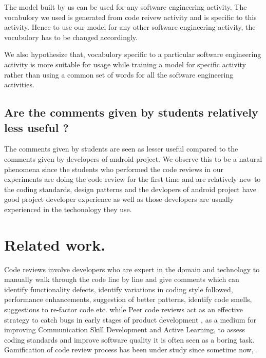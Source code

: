 \documentclass[conference]{IEEEtran}
\begin{document}
The model built by us can be used for any software engineering activity. The vocabulory we used is generated from code reivew activity and is specific to this activity. Hence to use our model for any other software engineering activity, the vocubulory has to be changed accordingly.

We also hypothesize that, vocabulory specific to a particular software engineering activity is more suitable for usage while training a model for specific activity rather than using a common set of words for all the software engineering activities.

\subsection{Are the comments given by students relatively less useful ?}
The comments given by students are seen as lesser useful compared to the comments given by developers of android project. We observe this to be a natural phenomena since the students who performed the code reviews in our experiments are doing the code review for the first time and are relatively new to the coding standards, design patterns and the devlopers of android project have good project developer experience as well as those developers are usually experienced in the techonology they use. 


\section{Related work.}


Code reviews involve developers who are expert in the domain and technology to manually walk through the code line by line and give comments which can identify functionality defects, identify variations in coding style followed, performance enhancements, suggestion of better patterns, identify code smells, suggestions to re-factor code etc. while Peer code reviews act as an effective strategy to catch bugs in early stages of product development \cite{Bacchelli2013}, as a medium for improving Communication Skill Development and Active Learning\cite{Anewalt2005}, to assess coding standards \cite{Li2006} and improve software quality\cite{McIntosh2014} it is often seen as a boring task. Gamification of code review process has been under study since sometime now\cite{emerson murphy hill paper}, \cite{Prause2015}. 
\end{document}
